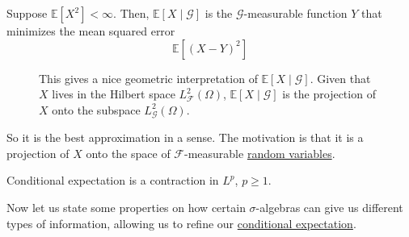  \begin{theorem}
    \label{thm:conditional-expectation-as-orthogonal-projection}
    Suppose $\mathbb{E}[X^2] < \infty$. Then, $\mathbb{E}[X \mid \mathcal{G}]$ is the $\mathcal{G}$-measurable function $Y$ that minimizes the mean squared error 
    \begin{equation}
      \mathbb{E}[ (X - Y)^2]
    \end{equation}

    \begin{figure}[H]
      \centering 
      \caption{This gives a nice geometric interpretation of $\mathbb{E}[X \mid \mathcal{G}]$. Given that $X$ lives in the Hilbert space $L^2_\mathcal{F} (\Omega)$, $\mathbb{E}[X \mid \mathcal{G}]$ is the projection of $X$ onto the subspace $L^2_\mathcal{G} (\Omega)$. } 
      \label{fig:conditional_expectation_projection}
    \end{figure}
  \end{theorem}

	So it is the best approximation in a sense. The motivation is that it is a projection of $X$ onto the space of $\mathcal{F}$-measurable \hyperref[def:random-variable]{random variables}. 

  \begin{corollary}
    \label{thm:conditional-expectation-is-an-lp-contraction}
    Conditional expectation is a contraction in $L^p$, $p \geq 1$. 
  \end{corollary}

  Now let us state some properties on how certain $\sigma$-algebras can give us different types of information, allowing us to refine our \hyperref[def:cond-exp]{conditional expectation}. 

